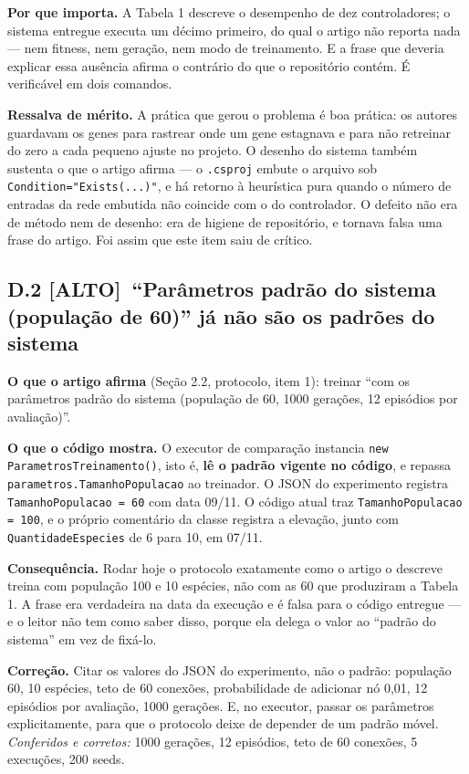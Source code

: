 \documentclass[11pt,a4paper]{article}
\newcommand{\alto}{\textbf{\color{orange!70!black}[ALTO]}}
\begin{document}
\textbf{Por que importa.} A Tabela 1 descreve o desempenho de dez controladores; o sistema entregue
executa um décimo primeiro, do qual o artigo não reporta nada --- nem fitness, nem geração, nem modo
de treinamento. E a frase que deveria explicar essa ausência afirma o contrário do que o repositório
contém. É verificável em dois comandos.

\textbf{Ressalva de mérito.} A prática que gerou o problema é boa prática: os autores guardavam os
genes para rastrear onde um gene estagnava e para não retreinar do zero a cada pequeno ajuste no
projeto. O desenho do sistema também sustenta o que o artigo afirma --- o \texttt{.csproj} embute o
arquivo sob \texttt{Condition="Exists(...)"}, e há retorno à heurística pura quando o número de
entradas da rede embutida não coincide com o do controlador. O defeito não era de método nem de
desenho: era de higiene de repositório, e tornava falsa uma frase do artigo. Foi assim que este item
saiu de crítico.

\subsection*{D.2 \alto\ ``Parâmetros padrão do sistema (população de 60)'' já não são os padrões do sistema}

\textbf{O que o artigo afirma} (Seção 2.2, protocolo, item 1): treinar ``com os parâmetros padrão do
sistema (população de 60, 1000 gerações, 12 episódios por avaliação)''.

\textbf{O que o código mostra.} O executor de comparação instancia \texttt{new
ParametrosTreinamento()}, isto é, \textbf{lê o padrão vigente no código}, e repassa
\texttt{parametros.TamanhoPopulacao} ao treinador. O JSON do experimento registra
\texttt{TamanhoPopulacao = 60} com data 09/11. O código atual traz
\texttt{TamanhoPopulacao = 100}, e o próprio comentário da classe registra a elevação, junto com
\texttt{QuantidadeEspecies} de 6 para 10, em 07/11.

\textbf{Consequência.} Rodar hoje o protocolo exatamente como o artigo o descreve treina com
população 100 e 10 espécies, não com as 60 que produziram a Tabela 1. A frase era verdadeira na data
da execução e é falsa para o código entregue --- e o leitor não tem como saber disso, porque ela
delega o valor ao ``padrão do sistema'' em vez de fixá-lo.

\textbf{Correção.} Citar os valores do JSON do experimento, não o padrão: população 60, 10 espécies,
teto de 60 conexões, probabilidade de adicionar nó 0,01, 12 episódios por avaliação, 1000 gerações. E,
no executor, passar os parâmetros explicitamente, para que o protocolo deixe de depender de um padrão
móvel. \textit{Conferidos e corretos:} 1000 gerações, 12 episódios, teto de 60 conexões, 5 execuções,
200 seeds.
\end{document}
